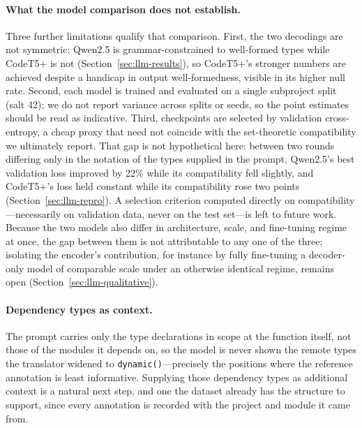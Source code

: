 \paragraph{What the model comparison does not establish.}
Three further limitations qualify that comparison.
First, the two decodings are not symmetric: Qwen2.5 is grammar-constrained to well-formed types while CodeT5+ is not (Section~\ref{sec:llm-results}), so CodeT5+'s stronger numbers are achieved despite a handicap in output well-formedness, visible in its higher null rate.
Second, each model is trained and evaluated on a single subproject split (salt 42); we do not report variance across splits or seeds, so the point estimates should be read as indicative.
Third, checkpoints are selected by validation cross-entropy, a cheap proxy that need not coincide with the set-theoretic compatibility we ultimately report.
That gap is not hypothetical here: between two rounds differing only in the notation of the types supplied in the prompt, Qwen2.5's best validation loss improved by \num{22}\% while its compatibility fell slightly, and CodeT5+'s loss held constant while its compatibility rose two points (Section~\ref{sec:llm-repro}).
A selection criterion computed directly on compatibility---necessarily on validation data, never on the test set---is left to future work.
Because the two models also differ in architecture, scale, and fine-tuning regime at once, the gap between them is not attributable to any one of the three; isolating the encoder's contribution, for instance by fully fine-tuning a decoder-only model of comparable scale under an otherwise identical regime, remains open (Section~\ref{sec:llm-qualitative}).

\paragraph{Dependency types as context.}
The prompt carries only the type declarations in scope at the function itself, not those of the modules it depends on, so the model is never shown the remote types the translator widened to \texttt{dynamic()}---precisely the positions where the reference annotation is least informative.
Supplying those dependency types as additional context is a natural next step, and one the dataset already has the structure to support, since every annotation is recorded with the project and module it came from.

